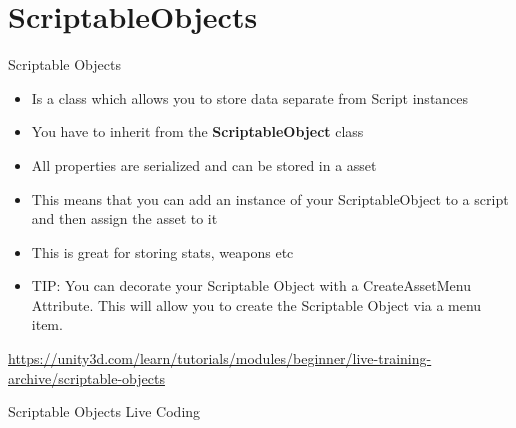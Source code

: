 \part{ScriptableObjects}
\frame{\partpage}

\begin{frame}{Scriptable Objects}
	\begin{itemize}
		\item Is a class which allows you to store data separate from Script instances
		\pause\item You have to inherit from the \textbf{ScriptableObject} class
		\pause\item All properties are serialized and can be stored in a asset
		\pause\item This means that you can add an instance of your ScriptableObject to a script and then assign the asset to it
		\pause\item This is great for storing stats, weapons etc
		\pause\item TIP: You can decorate your Scriptable Object with a CreateAssetMenu Attribute. This will allow you to create the Scriptable Object via a menu item.
	\end{itemize}
	\url{https://unity3d.com/learn/tutorials/modules/beginner/live-training-archive/scriptable-objects}
\end{frame}


\begin{frame}
	\begin{center}
		Scriptable Objects Live Coding
	\end{center}
\end{frame}
